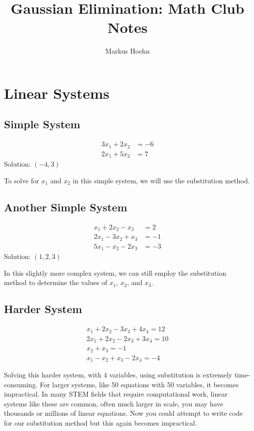 \documentclass{article}
\title{Gaussian Elimination: Math Club Notes}
\author{Markus Hoehn}
\date{}
\begin{document}
\maketitle

\section*{Linear Systems}

\subsection*{Simple System}
\begin{align*}
    3x_1 + 2x_2 &= -6 \\
    2x_1 + 5x_2 &= 7
\end{align*}
Solution: $(-4, 3)$

To solve for \(x_1\) and \(x_2\) in this simple system, we will use the substitution method. 

\subsection*{Another Simple System}
\begin{align*}
    x_1 + 2x_2 - x_3 &= 2 \\
    2x_1 - 3x_2 + x_3 &= -1 \\
    5x_1 - x_2 - 2x_3 &= -3
\end{align*}
Solution: $(1, 2, 3)$

In this slightly more complex system, we can still employ the substitution method to determine the values of \(x_1\), \(x_2\), and \(x_3\). 

\subsection*{Harder System}
\begin{align*}
    x_1 + 2x_2 - 3x_3 + 4x_4 = 12 \\
    2x_1 + 2x_2 - 2x_3 + 3x_4 = 10 \\
    x_2 + x_3 = -1 \\
    x_1 - x_2 + x_3 - 2x_4 = -4
\end{align*}

Solving this harder system, with 4 variables, using substitution is extremely time-consuming. For larger systems, like 50 equations with 50 variables, it becomes impractical. In many STEM fields that require computational work, linear systems like these are common, often much larger in scale, you may have thousands or millions of linear equations. Now you could attempt to write code for our substitution method but this again becomes impractical.
\end{document}
